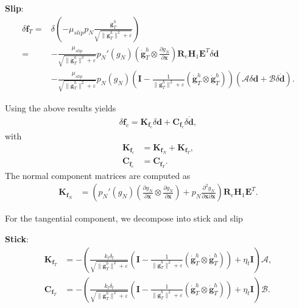 \documentclass[3p]{elsarticle}
\newcommand{\vect}[1]{\boldsymbol{#1}}
\begin{document}
\noindent\textbf{Slip}:
\begin{align}
	\delta\vect{f}_T=&\delta\left(-\mu_{slip} p_N\frac{\dot{\vect{g}}_T^h}{\sqrt{\|\dot{\vect{g}}_T^h\|^2+\varepsilon}}\right)\\
	=&-\frac{\mu_{slip}}{\sqrt{\|\dot{\vect{g}}_T^h\|^2+\varepsilon}}p_N'(g_N)\left(\dot{\vect{g}}_T^h\otimes\frac{\partial g_N}{\partial\vect{x}}\right)\vect{R}_e\vect{H}_1\vect{E}^T\delta\vect{d}\\
	&-\frac{\mu_{slip}}{\sqrt{\|\dot{\vect{g}}_T^h\|^2+\varepsilon}}p_N(g_N)\left(\vect{I}-\frac{1}{\|\dot{\vect{g}}_T^h\|^2+\varepsilon}(\dot{\vect{g}}_T^h\otimes\dot{\vect{g}}_T^h)\right)\left(\vect{\mathcal{A}}\delta\vect{d}+\vect{\mathcal{B}}\delta\dot{\vect{d}}\right).
\end{align}

\noindent Using the above results yields
\begin{align}
	\delta\vect{f}_c =\vect{K}_{\vect{f}_c}\delta\vect{d}+\vect{C}_{\vect{f}_c}\delta\dot{\vect{d}},\label{eq:deltafc-2}
\end{align}
\noindent with
\begin{align}
	\vect{K}_{\vect{f}_c}&=\vect{K}_{\vect{f}_N}+\vect{K}_{\vect{f}_T},\\
	\vect{C}_{\vect{f}_c}&=\vect{C}_{\vect{f}_T}.
\end{align}
The normal component matrices are computed as
\begin{align}
	\vect{K}_{\vect{f}_N} &=   \left( p_N'(g_N)\left(\frac{\partial g_N}{\partial\vect{x}}\otimes\frac{\partial g_N}{\partial\vect{x}}\right)+p_N\frac{\partial^2g_N}{\partial\vect{x}\partial\vect{x}}\right)\vect{R}_e\vect{H}_1\vect{E}^T.
\end{align}

For the tangential component, we decompose into stick and slip

\noindent\textbf{Stick}:
\begin{align}
	\vect{K}_{\vect{f}_T}&=-\left(\frac{k_t\delta_t}{\sqrt{\|\dot{\vect{g}}_T^h\|^2+\varepsilon}}\left(\vect{I}-\frac{1}{\|\dot{\vect{g}}_T^h\|^2+\varepsilon}(\dot{\vect{g}}_T^h\otimes\dot{\vect{g}}_T^h)\right)+\eta_t\vect{I}\right)\vect{\mathcal{A}},\\
	\vect{C}_{\vect{f}_T}&=-\left(\frac{k_t\delta_t}{\sqrt{\|\dot{\vect{g}}_T^h\|^2+\varepsilon}}\left(\vect{I}-\frac{1}{\|\dot{\vect{g}}_T^h\|^2+\varepsilon}(\dot{\vect{g}}_T^h\otimes\dot{\vect{g}}_T^h)\right)+\eta_t\vect{I}\right)\vect{\mathcal{B}}.
\end{align}
\end{document}

